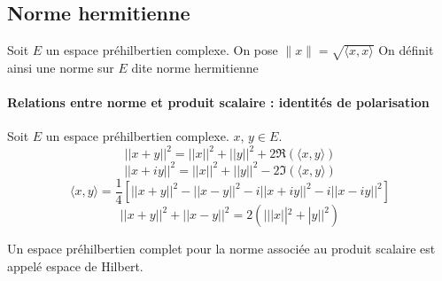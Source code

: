 \subsection{Norme hermitienne}
\begin{definition}
	Soit $E$ un espace préhilbertien complexe. On pose $\lVert x \rVert= \sqrt{\langle x,x \rangle}$ On définit ainsi une norme sur
	$E$ dite norme hermitienne
\end{definition}
\paragraph*{Relations entre norme et produit scalaire : identités de polarisation}
$ $\\Soit $E$ un espace préhilbertien complexe. $x$, $y \in E$.
\begin{equation}
||x+y||^2=||x||^2+||y||^2 +2\Re (\langle x,y\rangle)
\end{equation}
\begin{equation}
||x+iy||^2=||x||^2+||y||^2 -2\Im (\langle x,y\rangle)
\end{equation}
\begin{equation}
\langle x,y \rangle=\frac{1}{4}[||x+y||^2-||x-y||^2-i||x+iy||^2-i||x-iy||^2]
\end{equation}
\begin{equation}
||x+y||^2+||x-y||^2=2(|||x||^2+|y||^2)
\end{equation}
\begin{definition}
	Un espace préhilbertien complet pour la norme associée au produit scalaire est
	appelé espace de Hilbert.
\end{definition}
